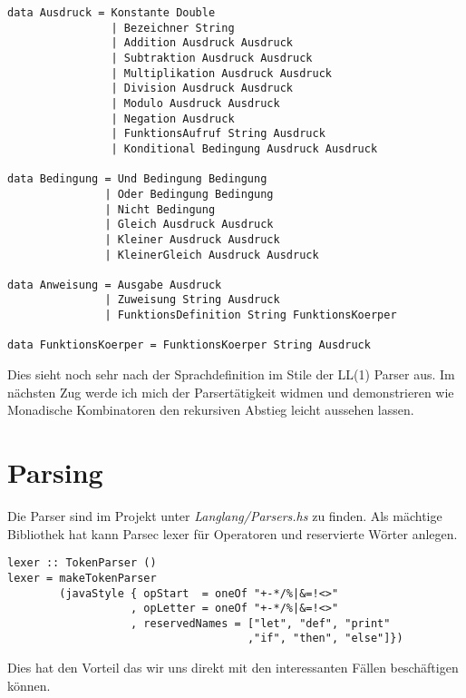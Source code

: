 \documentclass[12pt,german]{article}
\begin{document}
\begin{lstlisting}
data Ausdruck = Konstante Double
                | Bezeichner String
                | Addition Ausdruck Ausdruck
                | Subtraktion Ausdruck Ausdruck
                | Multiplikation Ausdruck Ausdruck
                | Division Ausdruck Ausdruck
                | Modulo Ausdruck Ausdruck
                | Negation Ausdruck
                | FunktionsAufruf String Ausdruck
                | Konditional Bedingung Ausdruck Ausdruck

data Bedingung = Und Bedingung Bedingung
               | Oder Bedingung Bedingung
               | Nicht Bedingung
               | Gleich Ausdruck Ausdruck
               | Kleiner Ausdruck Ausdruck
               | KleinerGleich Ausdruck Ausdruck

data Anweisung = Ausgabe Ausdruck
               | Zuweisung String Ausdruck
               | FunktionsDefinition String FunktionsKoerper

data FunktionsKoerper = FunktionsKoerper String Ausdruck
\end{lstlisting}

Dies sieht noch sehr nach der Sprachdefinition im Stile der LL(1)
Parser aus. Im nächsten Zug werde ich mich der Parsertätigkeit
widmen und demonstrieren wie Monadische Kombinatoren den rekursiven
Abstieg leicht aussehen lassen.

\section{Parsing}

Die Parser sind im Projekt unter \textit{Langlang/Parsers.hs} zu
finden. Als mächtige Bibliothek hat kann Parsec lexer für Operatoren
und reservierte Wörter anlegen.

\begin{lstlisting}
lexer :: TokenParser ()
lexer = makeTokenParser
        (javaStyle { opStart  = oneOf "+-*/%|&=!<>"
                   , opLetter = oneOf "+-*/%|&=!<>"
                   , reservedNames = ["let", "def", "print"
                                     ,"if", "then", "else"]})
\end{lstlisting}

\noindent Dies hat den Vorteil das wir uns direkt mit den interessanten Fällen
beschäftigen können.
\end{document}
